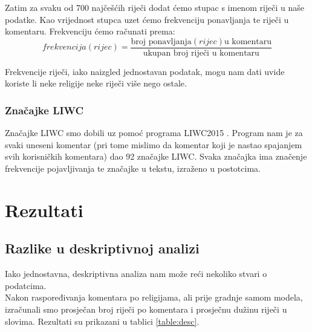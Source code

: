 \documentclass[times,utf8,zavrsni]{fer}
\begin{document}
Zatim za svaku od 700 najčešćih riječi dodat ćemo stupac s imenom riječi u naše podatke. Kao vrijednost stupca uzet ćemo frekvenciju ponavljanja te riječi u komentaru. Frekvenciju ćemo računati prema:
\begin{equation}
\label{frekv}
\mathit{frekvencija}\left(\mathit{rijec}\right)=\frac{\text{broj ponavljanja}\left(\mathit{rijec}\right)\text{u komentaru}}{\text{ukupan broj riječi u komentaru}}
\end{equation}

Frekvencije riječi, iako naizgled jednostavan podatak, mogu nam dati uvide koriste li neke religije neke riječi više nego ostale.

%
\subsection{Značajke LIWC}
Značajke LIWC smo dobili uz pomoć programa LIWC2015 \citep{liwc}. Program nam je za svaki uneseni komentar (pri tome mislimo da komentar koji je nastao spajanjem svih korisničkih komentara) dao 92 značajke LIWC. Svaka značajka ima značenje frekvencije pojavljivanja te značajke u tekstu, izraženo u postotcima.



\chapter{Rezultati}

\section{Razlike u deskriptivnoj analizi}

Iako jednostavna, deskriptivna analiza nam može reći nekoliko stvari o podatcima. \\

Nakon raspoređivanja komentara po religijama, ali prije gradnje samom modela, izračunali smo prosječan broj riječi po komentara i prosječnu dužinu riječi u slovima. Rezultati su prikazani u tablici \ref{table:desc}. \\
\end{document}
